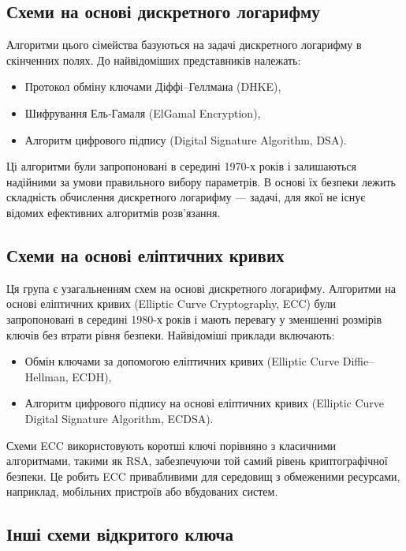 \documentclass[12pt]{report}
\theoremstyle{definition}
\theoremstyle{plain}
\begin{document}
\subsection{Схеми на основі дискретного логарифму}

Алгоритми цього сімейства базуються на задачі дискретного логарифму в скінченних полях. До найвідоміших представників належать:
\begin{itemize}
    \item Протокол обміну ключами Діффі–Геллмана (DHKE),
    \item Шифрування Ель-Гамаля (ElGamal Encryption),
    \item Алгоритм цифрового підпису (Digital Signature Algorithm, DSA).
\end{itemize}

Ці алгоритми були запропоновані в середині 1970-х років і залишаються надійними за умови правильного вибору параметрів. В основі їх безпеки лежить складність обчислення дискретного логарифму — задачі, для якої не існує відомих ефективних алгоритмів розв’язання.

\subsection{Схеми на основі еліптичних кривих}

Ця група є узагальненням схем на основі дискретного логарифму. Алгоритми на основі еліптичних кривих (Elliptic Curve Cryptography, ECC) були запропоновані в середині 1980-х років і мають перевагу у зменшенні розмірів ключів без втрати рівня безпеки. Найвідоміші приклади включають:
\begin{itemize}
    \item Обмін ключами за допомогою еліптичних кривих (Elliptic Curve Diffie–Hellman, ECDH),
    \item Алгоритм цифрового підпису на основі еліптичних кривих (Elliptic Curve Digital Signature Algorithm, ECDSA).
\end{itemize}

Схеми ECC використовують коротші ключі порівняно з класичними алгоритмами, такими як RSA, забезпечуючи той самий рівень криптографічної безпеки. Це робить ECC привабливими для середовищ з обмеженими ресурсами, наприклад, мобільних пристроїв або вбудованих систем.

\subsection{Інші схеми відкритого ключа}
\end{document}
